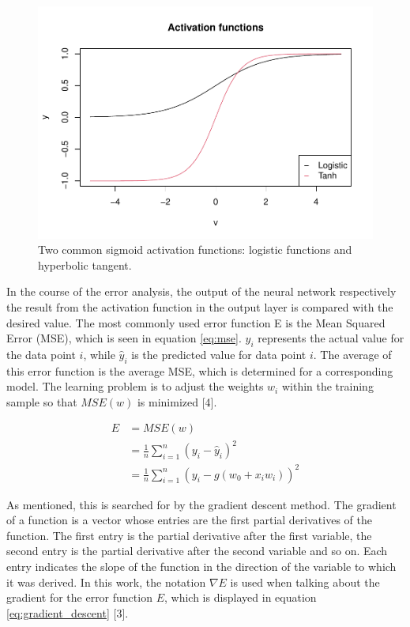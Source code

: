 \documentclass[
]{article}
\begin{document}
\begin{figure}

{\centering \includegraphics[width=0.7\linewidth]{00_main_files/figure-latex/sigmoid-1} 

}

\caption{Two common sigmoid activation functions: logistic functions and hyperbolic tangent.}\label{fig:sigmoid}
\end{figure}

In the course of the error analysis, the output of the neural network
respectively the result from the activation function in the output layer
is compared with the desired value. The most commonly used error
function E is the Mean Squared Error (MSE), which is seen in equation
\ref{eq:mse}. \(y_{i}\) represents the actual value for the data point
\(i\), while \(\hat{y}_{i}\) is the predicted value for data point
\(i\). The average of this error function is the average MSE, which is
determined for a corresponding model. The learning problem is to adjust
the weights \(w_{i}\) within the training sample so that \(MSE(w)\) is
minimized {[}4{]}.

\begin{align} \label{eq:mse}
  E &=MSE(w) \\
  &=\frac{1}{n}\sum_{i = 1}^{n}(y_{i}-\hat{y}_{i})^2 \nonumber \\
  &=\frac{1}{n}\sum_{i = 1}^{n}(y_{i}-g(w_{0}+x_{i}w_{i}))^2 \nonumber 
\end{align}

As mentioned, this is searched for by the gradient descent method. The
gradient of a function is a vector whose entries are the first partial
derivatives of the function. The first entry is the partial derivative
after the first variable, the second entry is the partial derivative
after the second variable and so on. Each entry indicates the slope of
the function in the direction of the variable to which it was derived.
In this work, the notation \(\nabla{E}\) is used when talking about the
gradient for the error function \(E\), which is displayed in equation
\ref{eq:gradient_descent} {[}3{]}.
\end{document}
